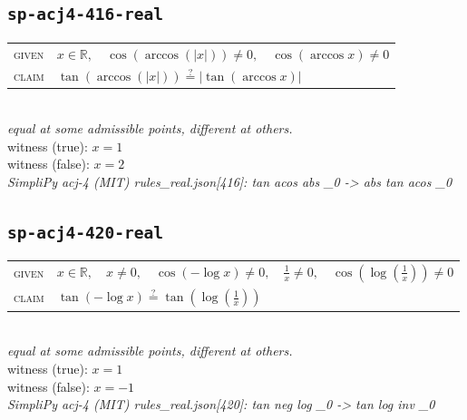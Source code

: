 \documentclass[11pt]{article}
\begin{document}
\subsection*{\texttt{sp-acj4-416-real}}
\begin{tabular}{@{}l@{\quad}l@{}}
\textsc{given} & $x \in \mathbb{R},\quad \cos\left(\arccos\left(\left|x\right|\right)\right) \neq 0,\quad \cos\left(\arccos x\right) \neq 0$ \\[4pt]
\textsc{claim} & $\displaystyle \tan\left(\arccos\left(\left|x\right|\right)\right) \overset{?}{=} \left|\tan\left(\arccos x\right)\right|$ \\
\end{tabular}\\[2pt]
{\small\emph{equal at some admissible points, different at others.}}\\
{\footnotesize\color{gray}witness (true): $x = 1$}\\
{\footnotesize\color{gray}witness (false): $x = 2$}\\
\emph{SimpliPy acj-4 (MIT) rules\_real.json[416]: tan acos abs \_0  ->  abs tan acos \_0}\\

\subsection*{\texttt{sp-acj4-420-real}}
\begin{tabular}{@{}l@{\quad}l@{}}
\textsc{given} & $x \in \mathbb{R},\quad x \neq 0,\quad \cos\left(-\log x\right) \neq 0,\quad \frac{1}{x} \neq 0,\quad \cos\left(\log\left(\frac{1}{x}\right)\right) \neq 0$ \\[4pt]
\textsc{claim} & $\displaystyle \tan\left(-\log x\right) \overset{?}{=} \tan\left(\log\left(\frac{1}{x}\right)\right)$ \\
\end{tabular}\\[2pt]
{\small\emph{equal at some admissible points, different at others.}}\\
{\footnotesize\color{gray}witness (true): $x = 1$}\\
{\footnotesize\color{gray}witness (false): $x = -1$}\\
\emph{SimpliPy acj-4 (MIT) rules\_real.json[420]: tan neg log \_0  ->  tan log inv \_0}\\
\end{document}

